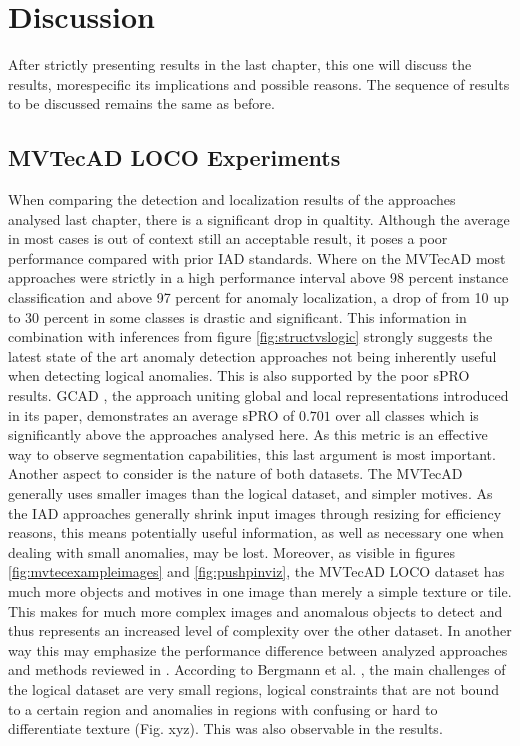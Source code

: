 \chapter{Discussion}
\label{chap:results}

After strictly presenting results in the last chapter, this one will discuss the results, morespecific its implications and possible reasons. 
The sequence of results to be discussed remains the same as before.


\section{MVTecAD LOCO Experiments}
\label{sec:locoresultssota}

When comparing the detection and localization results of the approaches analysed last chapter, there is a significant drop in qualtity. 
Although the average in most cases is out of context still an acceptable result, it poses a poor performance compared with prior 
IAD standards. Where on the MVTecAD \cite{MVTEC_Bergmann_2021} most approaches were strictly in a high performance interval above 98 percent 
instance classification and above 97 percent for anomaly localization, a drop of from 10 up to 30 percent in some classes is drastic and significant. 
This information in combination with inferences from figure \ref{fig:structvslogic} strongly suggests the latest state of 
the art anomaly detection approaches not being inherently useful when detecting logical anomalies. This is also supported by the 
poor sPRO results. GCAD \cite{LOCODentsAndScratchesBergmann2022}, the approach uniting global and local representations introduced in its 
paper, demonstrates an average sPRO of $0.701$ over all classes which is significantly above the approaches analysed here. As this metric 
is an effective way to observe segmentation capabilities, this last argument is most important. \newline
Another aspect to consider is the nature of both datasets. The MVTecAD \cite{MVTEC_Bergmann_2021} generally uses smaller images than the 
logical dataset, and simpler motives. As the IAD approaches generally shrink input images through resizing for efficiency reasons, 
this means potentially useful information, as well as necessary one when dealing with small anomalies, may be lost. 
Moreover, as visible in figures \ref{fig:mvtecexampleimages} and \ref{fig:pushpinviz}, the MVTecAD LOCO dataset 
has much more objects and motives in one image than merely a simple texture or tile. This makes for much more complex images and anomalous objects 
to detect and thus represents an increased level of complexity over the other dataset. In another way this may emphasize the performance 
difference between analyzed approaches and methods reviewed in \cite{LOCODentsAndScratchesBergmann2022}. \newline
According to Bergmann et al. \cite{LOCODentsAndScratchesBergmann2022}, the main challenges of the logical dataset are very small regions, logical constraints that are 
not bound to a certain region and anomalies in regions with confusing or hard to differentiate texture (Fig. xyz). This was also observable in the results.

